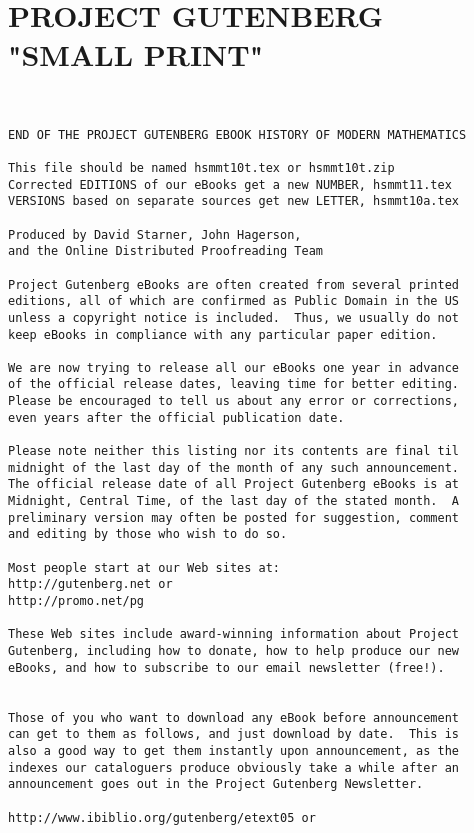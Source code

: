 \documentclass[oneside]{book}
\begin{document}
{\newpage



\chapter{PROJECT GUTENBERG "SMALL PRINT"}
\small
{}
\begin{verbatim}


END OF THE PROJECT GUTENBERG EBOOK HISTORY OF MODERN MATHEMATICS

This file should be named hsmmt10t.tex or hsmmt10t.zip
Corrected EDITIONS of our eBooks get a new NUMBER, hsmmt11.tex
VERSIONS based on separate sources get new LETTER, hsmmt10a.tex

Produced by David Starner, John Hagerson,
and the Online Distributed Proofreading Team

Project Gutenberg eBooks are often created from several printed
editions, all of which are confirmed as Public Domain in the US
unless a copyright notice is included.  Thus, we usually do not
keep eBooks in compliance with any particular paper edition.

We are now trying to release all our eBooks one year in advance
of the official release dates, leaving time for better editing.
Please be encouraged to tell us about any error or corrections,
even years after the official publication date.

Please note neither this listing nor its contents are final til
midnight of the last day of the month of any such announcement.
The official release date of all Project Gutenberg eBooks is at
Midnight, Central Time, of the last day of the stated month.  A
preliminary version may often be posted for suggestion, comment
and editing by those who wish to do so.

Most people start at our Web sites at:
http://gutenberg.net or
http://promo.net/pg

These Web sites include award-winning information about Project
Gutenberg, including how to donate, how to help produce our new
eBooks, and how to subscribe to our email newsletter (free!).


Those of you who want to download any eBook before announcement
can get to them as follows, and just download by date.  This is
also a good way to get them instantly upon announcement, as the
indexes our cataloguers produce obviously take a while after an
announcement goes out in the Project Gutenberg Newsletter.

http://www.ibiblio.org/gutenberg/etext05 or


\end{verbatim}}
\end{document}

